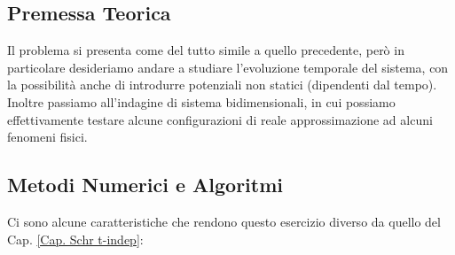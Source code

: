 \subsection{Premessa Teorica}
Il problema si presenta come del tutto simile a quello precedente, però in particolare desideriamo andare a studiare l'evoluzione temporale del sistema, con la possibilità anche di introdurre potenziali non statici (dipendenti dal tempo).
Inoltre passiamo all'indagine di sistema bidimensionali, in cui possiamo effettivamente testare alcune configurazioni di reale approssimazione ad alcuni fenomeni fisici. 


\subsection{Metodi Numerici e Algoritmi}
Ci sono alcune caratteristiche che rendono questo esercizio diverso da quello del Cap. \ref{Cap. Schr t-indep}:
